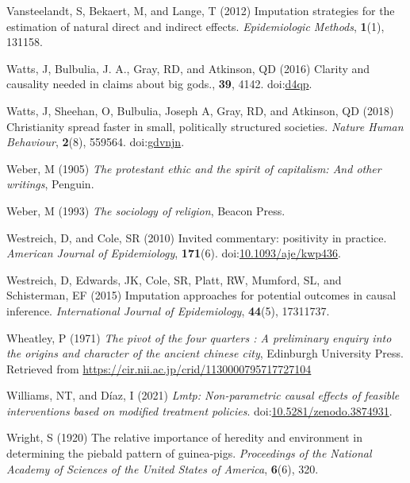 \documentclass[
  singlecolumn]{article}
\newlength{\cslhangindent}
\newlength{\cslentryspacingunit} %
\newenvironment{CSLReferences}[2] %
 {%
  \setlength{\parindent}{0pt}
  \ifodd #1
  \let\oldpar\par
  \def\par{\hangindent=\cslhangindent\oldpar}
  \fi
  \setlength{\parskip}{#2\cslentryspacingunit}
 }%
 {}
\begin{document}
\begin{CSLReferences}{1}{0}
\leavevmode{}%
Vansteelandt, S, Bekaert, M, and Lange, T (2012) Imputation strategies
for the estimation of natural direct and indirect effects.
\emph{Epidemiologic Methods}, \textbf{1}(1), 131158.

\leavevmode{}%
Watts, J, Bulbulia, J. A., Gray, RD, and Atkinson, QD (2016) Clarity and
causality needed in claims about big gods., \textbf{39}, 4142.
doi:\href{https://doi.org/d4qp}{d4qp}.

\leavevmode{}%
Watts, J, Sheehan, O, Bulbulia, Joseph A, Gray, RD, and Atkinson, QD
(2018) Christianity spread faster in small, politically structured
societies. \emph{Nature Human Behaviour}, \textbf{2}(8), 559564.
doi:\href{https://doi.org/gdvnjn}{gdvnjn}.

\leavevmode{}%
Weber, M (1905) \emph{The protestant ethic and the spirit of capitalism:
And other writings}, Penguin.

\leavevmode{}%
Weber, M (1993) \emph{The sociology of religion}, Beacon Press.

\leavevmode{}%
Westreich, D, and Cole, SR (2010) Invited commentary: positivity in
practice. \emph{American Journal of Epidemiology}, \textbf{171}(6).
doi:\href{https://doi.org/10.1093/aje/kwp436}{10.1093/aje/kwp436}.

\leavevmode{}%
Westreich, D, Edwards, JK, Cole, SR, Platt, RW, Mumford, SL, and
Schisterman, EF (2015) Imputation approaches for potential outcomes in
causal inference. \emph{International Journal of Epidemiology},
\textbf{44}(5), 17311737.

\leavevmode{}%
Wheatley, P (1971) \emph{The pivot of the four quarters : A preliminary
enquiry into the origins and character of the ancient chinese city},
Edinburgh University Press. Retrieved from
\url{https://cir.nii.ac.jp/crid/1130000795717727104}

\leavevmode{}%
Williams, NT, and Díaz, I (2021) \emph{Lmtp: Non-parametric causal
effects of feasible interventions based on modified treatment policies}.
doi:\href{https://doi.org/10.5281/zenodo.3874931}{10.5281/zenodo.3874931}.

\leavevmode{}%
Wright, S (1920) The relative importance of heredity and environment in
determining the piebald pattern of guinea-pigs. \emph{Proceedings of the
National Academy of Sciences of the United States of America},
\textbf{6}(6), 320.


\end{CSLReferences}
\end{document}
